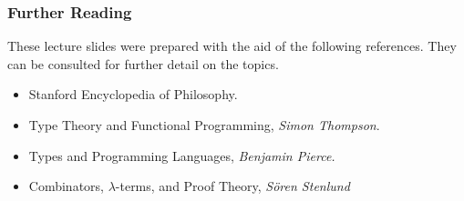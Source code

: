\documentclass{beamer}
\begin{document}
\begin{frame}
	\frametitle{Further Reading}
	
    These lecture slides were prepared with the aid of the following references. They can be consulted for further detail on the topics. 

    \begin{itemize}
		\item Stanford Encyclopedia of Philosophy.
		\item Type Theory and Functional Programming, \emph{Simon Thompson}.
		\item Types and Programming Languages, \emph{Benjamin Pierce.}
		\item Combinators, $\lambda$-terms, and Proof Theory, \emph{S\"{o}ren Stenlund}
	\end{itemize}

	
	
\end{frame}
\end{document}
